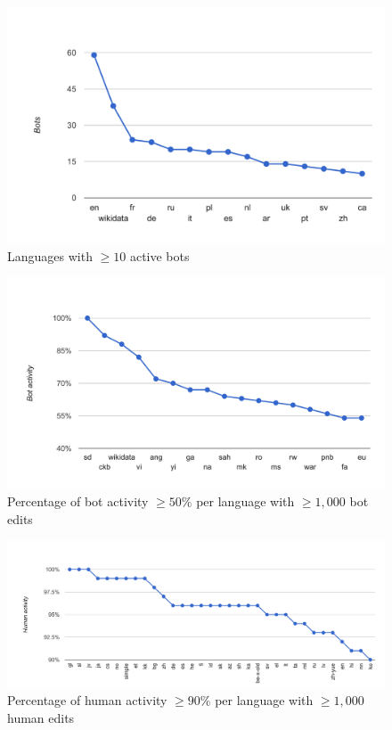 \documentclass{sig-alternate}
\begin{document}
\begin{figure}[p]
  \center
  \includegraphics[width=0.9\linewidth]{bots-per-language.pdf}
  \caption{Languages with $\geq10$ active bots}
  \label{fig:bots-per-language}
\end{figure}

\begin{figure}[p]
  \center
  \includegraphics[width=0.9\linewidth]{most-bot-edited-languages.pdf}
  \caption{Percentage of bot activity $\geq50\%$ per language with $\geq1,000$ bot edits}
  \label{fig:most-bot-edited-languages}
\end{figure}

\begin{figure}[p]
  \center
  \includegraphics[width=\linewidth]{most-human-edited-languages.pdf}
  \caption{Percentage of human activity $\geq90\%$ per language with $\geq1,000$ human edits}
  \label{fig:most-human-edited-languages}
\end{figure}
\end{document}
